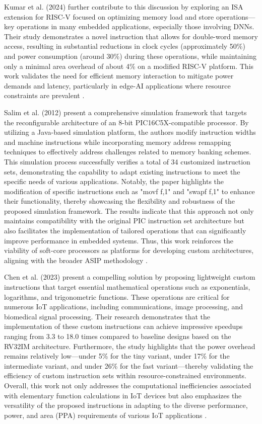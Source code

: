 Kumar et al. (2024) further contribute to this discussion by exploring an ISA extension for RISC-V focused on optimizing memory load and store operations—key operations in many embedded applications, especially those involving DNNs. Their study demonstrates a novel instruction that allows for double-word memory access, resulting in substantial reductions in clock cycles (approximately 50\%) and power consumption (around 30\%) during these operations, while maintaining only a minimal area overhead of about 4\% on a modified RISC-V platform. This work validates the need for efficient memory interaction to mitigate power demands and latency, particularly in edge-AI applications where resource constraints are prevalent \cite{kumar2024implementation}.

Salim et al. (2012) present a comprehensive simulation framework that targets the reconfigurable architecture of an 8-bit PIC16C5X-compatible processor. By utilizing a Java-based simulation platform, the authors modify instruction widths and machine instructions while incorporating memory address remapping techniques to effectively address challenges related to memory banking schemes. This simulation process successfully verifies a total of 34 customized instruction sets, demonstrating the capability to adapt existing instructions to meet the specific needs of various applications. Notably, the paper highlights the modification of specific instructions such as "movf f,1" and "swapf f,1" to enhance their functionality, thereby showcasing the flexibility and robustness of the proposed simulation framework. The results indicate that this approach not only maintains compatibility with the original PIC instruction set architecture but also facilitates the implementation of tailored operations that can significantly improve performance in embedded systems. Thus, this work reinforces the viability of soft-core processors as platforms for developing custom architectures, aligning with the broader ASIP methodology \cite{salim2012customized}.

Chen et al. (2023) present a compelling solution by proposing lightweight custom instructions that target essential mathematical operations such as exponentials, logarithms, and trigonometric functions. These operations are critical for numerous IoT applications, including communications, image processing, and biomedical signal processing. Their research demonstrates that the implementation of these custom instructions can achieve impressive speedups ranging from 3.3 to 18.0 times compared to baseline designs based on the RV32IM architecture. Furthermore, the study highlights that the power overhead remains relatively low—under 5\% for the tiny variant, under 17\% for the intermediate variant, and under 26\% for the fast variant—thereby validating the efficiency of custom instruction sets within resource-constrained environments. Overall, this work not only addresses the computational inefficiencies associated with elementary function calculations in IoT devices but also emphasizes the versatility of the proposed instructions in adapting to the diverse performance, power, and area (PPA) requirements of various IoT applications \cite{chen2023risc}.

